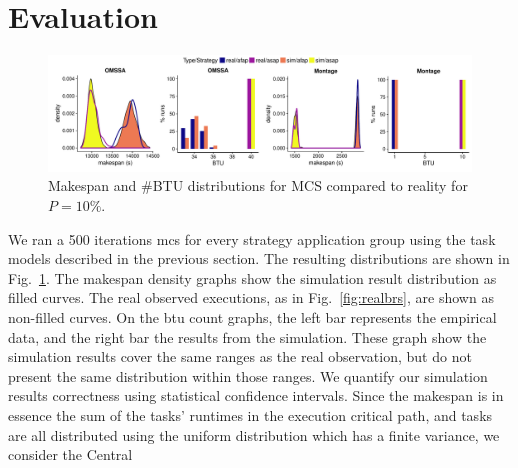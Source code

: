 \documentclass[]{llncs}
\begin{document}
\section{Evaluation}
\label{sec:eval}
\begin{figure}[bt]
	\includegraphics[width=\textwidth]{gfx/fit_plot.pdf}
	\caption[caption]{Makespan and \#BTU distributions for MCS compared to
		reality for $P=10\%$.%
	}
	\label{fig:fit}
\end{figure}
We ran a 500 iterations \ac{mcs} for every strategy application group using
the task models described in  the previous section. The  resulting distributions
are  shown  in  Fig.~\ref{fig:fit}.   The makespan  density  graphs  show  the
simulation  result  distribution   as  filled  curves. The  real  observed
executions, as in  Fig.~\ref{fig:realbrs}, are shown as  non-filled curves. On 
the \ac{btu} count graphs, the  left bar represents
the empirical data, and the right  bar the results from the simulation.
%
These graph show the simulation results cover the same ranges as the real
observation, but do not present the same distribution within those ranges. 
%
%
We quantify our simulation results correctness using statistical confidence
intervals.   Since the makespan is in essence  the sum of the tasks' runtimes
in the  execution critical path,  and tasks  are all distributed  using the
uniform distribution  which  has a  finite variance,  we consider the Central
\end{document}
